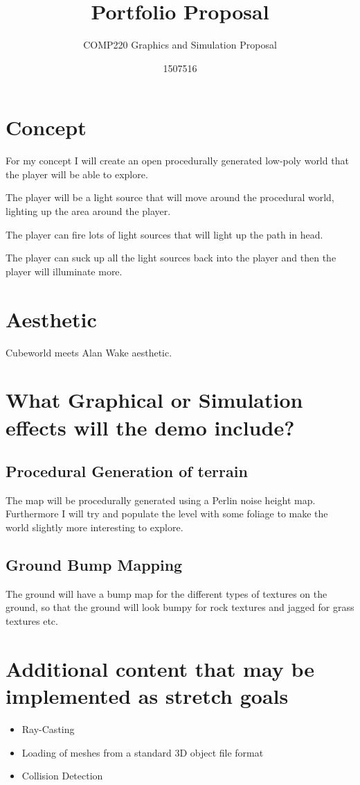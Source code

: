 \documentclass{scrartcl}
\title{Portfolio Proposal}
\subtitle{COMP220 Graphics and Simulation Proposal}
\author{1507516}
\begin{document}
\maketitle

\abstract{}

\section{Concept}
For my concept I will create an open procedurally generated low-poly world that the player will be able to explore.

The player will be a light source that will move around the procedural world, lighting up the area around the player.

The player can fire lots of light sources that will light up the path in head.

The player can suck up all the light sources back into the player and then the player will illuminate more.

\section{Aesthetic}

Cubeworld meets Alan Wake aesthetic.

\section{What Graphical or Simulation effects will the demo include?}

\subsection{Procedural Generation of terrain}

The map will be procedurally generated using a Perlin noise height map. Furthermore I will try and populate the level with some foliage to make the world slightly more interesting to explore.

\subsection{Ground Bump Mapping}

The ground will have a bump map for the different types of textures on the ground, so that the ground will look bumpy for rock textures and jagged for grass textures etc.

\section{Additional content that may be implemented as stretch goals}


\begin{itemize}
\item Ray-Casting
\item Loading of meshes from a standard 3D object file format
\item Collision Detection
\end{itemize}
\end{document}
